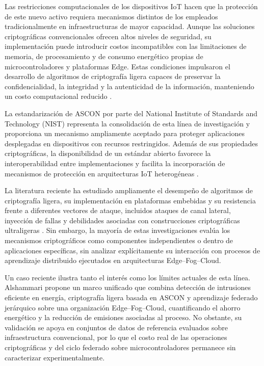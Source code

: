 \documentclass[journal,article,submit,moreauthors]{Definitions/mdpi}
\begin{document}
Las restricciones computacionales de los dispositivos IoT hacen que la protección de este nuevo activo requiera mecanismos distintos de los empleados tradicionalmente en infraestructuras de mayor capacidad. Aunque las soluciones criptográficas convencionales ofrecen altos niveles de seguridad, su implementación puede introducir costos incompatibles con las limitaciones de memoria, de procesamiento y de consumo energético propias de microcontroladores y plataformas Edge. Estas condiciones impulsaron el desarrollo de algoritmos de criptografía ligera capaces de preservar la confidencialidad, la integridad y la autenticidad de la información, manteniendo un costo computacional reducido \cite{NISTIR8454,NIST800232,Gusita2025,Kaur2025,Sorescu2025}.

La estandarización de ASCON por parte del National Institute of Standards and Technology (NIST) representa la consolidación de esta línea de investigación y proporciona un mecanismo ampliamente aceptado para proteger aplicaciones desplegadas en dispositivos con recursos restringidos. Además de sus propiedades criptográficas, la disponibilidad de un estándar abierto favorece la interoperabilidad entre implementaciones y facilita la incorporación de mecanismos de protección en arquitecturas IoT heterogéneas \cite{NIST800232,Kaur2025}.

La literatura reciente ha estudiado ampliamente el desempeño de algoritmos de criptografía ligera, su implementación en plataformas embebidas y su resistencia frente a diferentes vectores de ataque, incluidos ataques de canal lateral, inyección de fallas y debilidades asociadas con construcciones criptográficas ultraligeras \cite{Kaur2025,Mirzaali2025,Gusita2025}. Sin embargo, la mayoría de estas investigaciones evalúa los mecanismos criptográficos como componentes independientes o dentro de aplicaciones específicas, sin analizar explícitamente su interacción con procesos de aprendizaje distribuido ejecutados en arquitecturas Edge--Fog--Cloud.

Un caso reciente ilustra tanto el interés como los límites actuales de esta línea. Alshammari \cite{Alshammari2026} propone un marco unificado que combina detección de intrusiones eficiente en energía, criptografía ligera basada en ASCON y aprendizaje federado jerárquico sobre una organización Edge--Fog--Cloud, cuantificando el ahorro energético y la reducción de emisiones asociadas al proceso. No obstante, su validación se apoya en conjuntos de datos de referencia evaluados sobre infraestructura convencional, por lo que el costo real de las operaciones criptográficas y del ciclo federado sobre microcontroladores permanece sin caracterizar experimentalmente.
\end{document}

